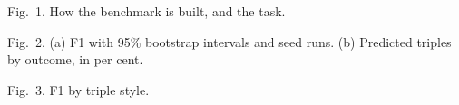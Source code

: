 \documentclass[10pt]{article}
\begin{document}
\begin{center}
\par\medskip
{\small Fig.~1. How the benchmark is built, and the task.}
\end{center}
\bigskip

\begin{center}
\par\medskip
{\small Fig.~2. (a) F1 with 95\% bootstrap intervals and seed runs.
(b) Predicted triples by outcome, in per cent.}
\end{center}
\bigskip

\begin{center}
\par\medskip
{\small Fig.~3. F1 by triple style.}
\end{center}
\end{document}

